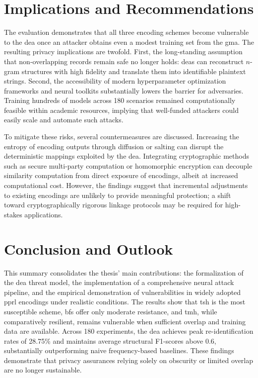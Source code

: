 \documentclass[a4paper,11pt]{scrartcl}
\begin{document}
\section{Implications and Recommendations}
The evaluation demonstrates that all three encoding schemes become vulnerable to the \ac{dea} once an attacker obtains even a modest training set from the \ac{gma}. 
The resulting privacy implications are twofold. 
First, the long-standing assumption that non-overlapping records remain safe no longer holds: \ac{dea}s can reconstruct \(n\)-gram structures with high fidelity and translate them into identifiable plaintext strings. 
Second, the accessibility of modern hyperparameter optimization frameworks and neural toolkits substantially lowers the barrier for adversaries. 
Training hundreds of models across 180 scenarios remained computationally feasible within academic resources, implying that well-funded attackers could easily scale and automate such attacks. 

To mitigate these risks, several countermeasures are discussed. 
Increasing the entropy of encoding outputs through diffusion or salting can disrupt the deterministic mappings exploited by the \ac{dea}. 
Integrating cryptographic methods such as secure multi-party computation or homomorphic encryption can decouple similarity computation from direct exposure of encodings, albeit at increased computational cost. 
However, the findings suggest that incremental adjustments to existing encodings are unlikely to provide meaningful protection; a shift toward cryptographically rigorous linkage protocols may be required for high-stakes applications.

\section{Conclusion and Outlook}

This summary consolidates the thesis' main contributions: the formalization of the \ac{dea} threat model, the implementation of a comprehensive neural attack pipeline, and the empirical demonstration of vulnerabilities in widely adopted \ac{pprl} encodings under realistic conditions. 
The results show that \ac{tsh} is the most susceptible scheme, \ac{bf}s offer only moderate resistance, and \ac{tmh}, while comparatively resilient, remains vulnerable when sufficient overlap and training data are available. 
Across 180 experiments, the \ac{dea} achieves peak re-identification rates of 28.75\% and maintains average structural F1-scores above 0.6, substantially outperforming naive frequency-based baselines. 
These findings demonstrate that privacy assurances relying solely on obscurity or limited overlap are no longer sustainable.
\end{document}
